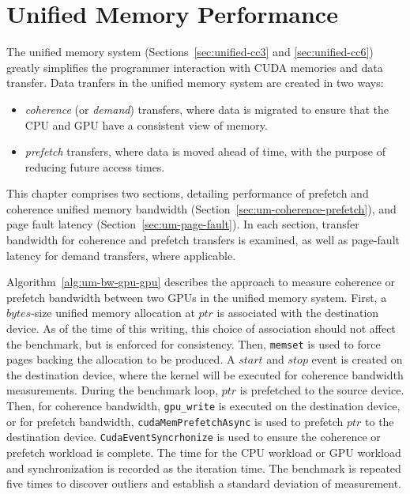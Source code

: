 \chapter{Unified Memory Performance}
\label{ch:unified}

The unified memory system (Sections~\ref{sec:unified-cc3} and \ref{sec:unified-cc6}) greatly simplifies the programmer interaction with CUDA memories and data transfer.
Data tranfers in the unified memory system are created in two ways:
\begin{itemize}
	\item \textit{coherence} (or \textit{demand}) transfers, where data is migrated to ensure that the CPU and GPU have a consistent view of memory.
	\item \textit{prefetch} transfers, where data is moved ahead of time, with the purpose of reducing future access times. 
\end{itemize}
This chapter comprises two sections, detailing performance of prefetch and coherence unified memory bandwidth (Section~\ref{sec:um-coherence-prefetch}), and page fault latency (Section~\ref{sec:um-page-fault}).
In each section, transfer bandwidth for coherence and prefetch transfers is examined, as well as page-fault latency for demand transfers, where applicable.

Algorithm~\ref{alg:um-bw-gpu-gpu} describes the approach to measure coherence or prefetch bandwidth between two GPUs in the unified memory system.
First, a $bytes$-size unified memory allocation at $ptr$ is associated with the destination device.
As of the time of this writing, this choice of association should not affect the benchmark, but is enforced for consistency.
Then, \texttt{memset} is used to force pages backing the allocation to be produced.
A $start$ and $stop$ event is created on the destination device, where the kernel will be executed for coherence bandwidth measurements.
During the benchmark loop, $ptr$ is prefetched to the source device.
Then, for coherence bandwidth, \texttt{gpu\_write} is executed on the destination device, or for prefetch bandwidth, \texttt{cudaMemPrefetchAsync} is used to prefetch $ptr$ to the destination device.
\texttt{CudaEventSyncrhonize} is used to ensure the coherence or prefetch workload is complete.
The time for the CPU workload or GPU workload and synchronization is recorded as the iteration time.
The benchmark is repeated five times to discover outliers and establish a standard deviation of measurement.

